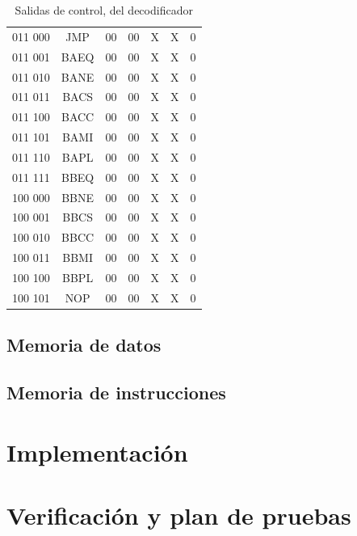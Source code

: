 \documentclass[paper=letter, fontsize=12pt]{article}
\begin{document}
\begin{table}
\begin{tabular}{cc|ccccc}
011 000 	& JMP			& 00 	& 00    & X     & X     & 0 \\
011 001 	& BAEQ			& 00 	& 00    & X     & X     & 0 \\
011 010 	& BANE			& 00 	& 00    & X     & X     & 0 \\
011 011 	& BACS			& 00 	& 00    & X     & X     & 0 \\
011 100 	& BACC			& 00 	& 00    & X     & X     & 0 \\
011 101 	& BAMI			& 00 	& 00    & X     & X     & 0 \\
011 110 	& BAPL			& 00 	& 00    & X     & X     & 0 \\
011 111 	& BBEQ			& 00 	& 00    & X     & X     & 0 \\
100 000 	& BBNE			& 00 	& 00    & X     & X     & 0 \\
100 001 	& BBCS			& 00 	& 00    & X     & X     & 0 \\
100 010 	& BBCC			& 00 	& 00    & X     & X     & 0 \\
100 011 	& BBMI			& 00 	& 00    & X     & X     & 0 \\
100 100 	& BBPL			& 00 	& 00    & X     & X     & 0 \\

100 101 	& NOP			& 00 	& 00    & X     & X     & 0 \\

\end{tabular}
\caption{Salidas de control, del decodificador}
\label{tablaDecodificacion}
\end{table}


\subsection{Memoria de datos}

\subsection{Memoria de instrucciones}

\section{Implementación}

\section{Verificación y plan de pruebas}
\end{document}
